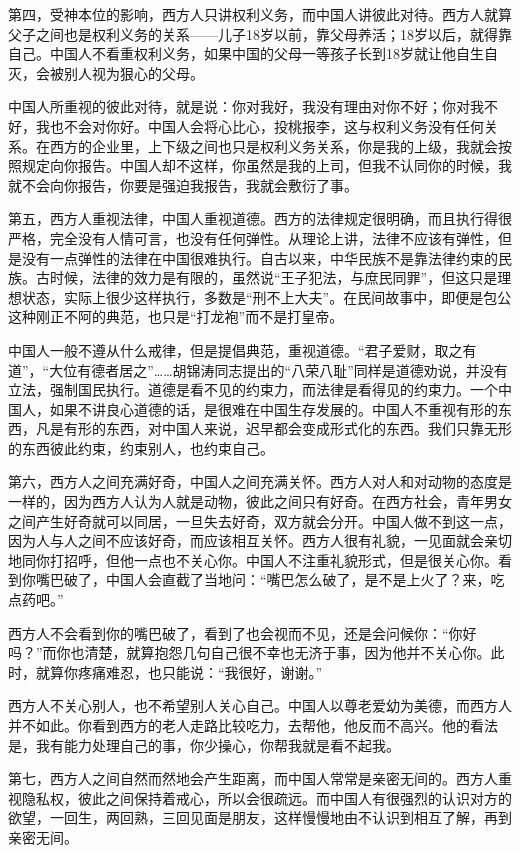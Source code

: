 \documentclass[fontset=fandol, a4paper, 12pt, openright]{ctexbook}
\begin{document}
第四，受神本位的影响，西方人只讲权利义务，而中国人讲彼此对待。西方人就算父子之间也是权利义务的关系——儿子18岁以前，靠父母养活；18岁以后，就得靠自己。中国人不看重权利义务，如果中国的父母一等孩子长到18岁就让他自生自灭，会被别人视为狠心的父母。

中国人所重视的彼此对待，就是说：你对我好，我没有理由对你不好；你对我不好，我也不会对你好。中国人会将心比心，投桃报李，这与权利义务没有任何关系。在西方的企业里，上下级之间也只是权利义务关系，你是我的上级，我就会按照规定向你报告。中国人却不这样，你虽然是我的上司，但我不认同你的时候，我就不会向你报告，你要是强迫我报告，我就会敷衍了事。

第五，西方人重视法律，中国人重视道德。西方的法律规定很明确，而且执行得很严格，完全没有人情可言，也没有任何弹性。从理论上讲，法律不应该有弹性，但是没有一点弹性的法律在中国很难执行。自古以来，中华民族不是靠法律约束的民族。古时候，法律的效力是有限的，虽然说“王子犯法，与庶民同罪”，但这只是理想状态，实际上很少这样执行，多数是“刑不上大夫”。在民间故事中，即便是包公这种刚正不阿的典范，也只是“打龙袍”而不是打皇帝。

中国人一般不遵从什么戒律，但是提倡典范，重视道德。“君子爱财，取之有道”，“大位有德者居之”……胡锦涛同志提出的“八荣八耻”同样是道德劝说，并没有立法，强制国民执行。道德是看不见的约束力，而法律是看得见的约束力。一个中国人，如果不讲良心道德的话，是很难在中国生存发展的。中国人不重视有形的东西，凡是有形的东西，对中国人来说，迟早都会变成形式化的东西。我们只靠无形的东西彼此约束，约束别人，也约束自己。

第六，西方人之间充满好奇，中国人之间充满关怀。西方人对人和对动物的态度是一样的，因为西方人认为人就是动物，彼此之间只有好奇。在西方社会，青年男女之间产生好奇就可以同居，一旦失去好奇，双方就会分开。中国人做不到这一点，因为人与人之间不应该好奇，而应该相互关怀。西方人很有礼貌，一见面就会亲切地同你打招呼，但他一点也不关心你。中国人不注重礼貌形式，但是很关心你。看到你嘴巴破了，中国人会直截了当地问：“嘴巴怎么破了，是不是上火了？来，吃点药吧。”

西方人不会看到你的嘴巴破了，看到了也会视而不见，还是会问候你：“你好吗？”而你也清楚，就算抱怨几句自己很不幸也无济于事，因为他并不关心你。此时，就算你疼痛难忍，也只能说：“我很好，谢谢。”

西方人不关心别人，也不希望别人关心自己。中国人以尊老爱幼为美德，而西方人并不如此。你看到西方的老人走路比较吃力，去帮他，他反而不高兴。他的看法是，我有能力处理自己的事，你少操心，你帮我就是看不起我。

第七，西方人之间自然而然地会产生距离，而中国人常常是亲密无间的。西方人重视隐私权，彼此之间保持着戒心，所以会很疏远。而中国人有很强烈的认识对方的欲望，一回生，两回熟，三回见面是朋友，这样慢慢地由不认识到相互了解，再到亲密无间。
\end{document}
